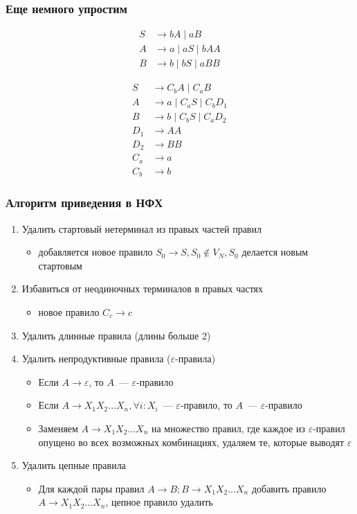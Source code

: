 \documentclass{beamer}
\begin{document}
\begin{frame}[fragile]
  \transwipe[direction=90]
  \frametitle{Еще немного упростим}

\begin{align*}
  S &\to bA \mid aB \\
  A &\to a  \mid aS \mid bAA  \\
  B &\to b  \mid bS \mid aBB
\end{align*}

\vfill

\begin{align*}
  S   &\to C_b A \mid C_a B \\
  A   &\to a \mid C_a S \mid C_b D_1 \\
  B   &\to b \mid C_b S \mid C_a D_2 \\
  D_1 &\to A A \\
  D_2 &\to B B \\
  C_a &\to a \\
  C_b &\to b
\end{align*}
\end{frame}

\begin{frame}[fragile]
  \transwipe[direction=90]
  \frametitle{Алгоритм приведения в НФХ}

  \begin{enumerate}
    \item Удалить стартовый нетерминал из правых частей правил
    \begin{itemize}
      \item добавляется новое правило $S_0 \to S, S_0 \notin V_N, S_0$ делается новым стартовым
    \end{itemize}
    \item Избавиться от неодиночных терминалов в правых частях
    \begin{itemize}
      \item новое правило $C_c \to c$
    \end{itemize}
    \item Удалить длинные правила (длины больше 2)
    \item Удалить непродуктивные правила ($\varepsilon$-правила)
    \begin{itemize}
      \item Если $A \to \varepsilon$, то $A$~--- $\varepsilon$-правило
      \item Если $A \to X_1 X_2 \dots X_n, \forall i: X_i$~--- $\varepsilon$-правило, то $A$~--- $\varepsilon$-правило
      \item Заменяем $A \to X_1 X_2 \dots X_n$ на множество правил, где каждое из $\varepsilon$-правил опущено во всех возможных комбинациях, удаляем те, которые выводят $\varepsilon$
    \end{itemize}
    \item Удалить цепные правила
    \begin{itemize}
      \item Для каждой пары правил $A \to B; B \to  X_1 X_2 \dots X_n$ добавить правило $A \to  X_1 X_2 \dots X_n$, цепное правило удалить
    \end{itemize}
  \end{enumerate}
\end{frame}
\end{document}
